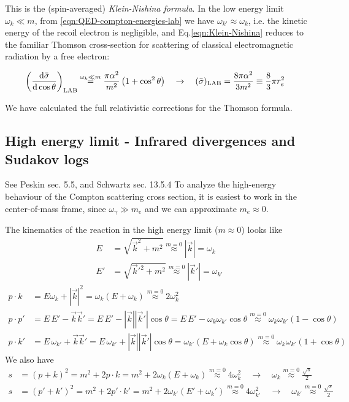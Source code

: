 \documentclass[TheoreticalPhy_ModB.tex]{subfiles}
\begin{document}
This is the (spin-averaged) \emph{Klein-Nishina formula}.
In the low energy limit $\omega_k\ll m$, from \eqref{eqn:QED-compton-energies-lab} we have $\omega_{k'}\approx\omega_{k}$, i.e. the kinetic energy of the recoil electron is negligible, and Eq.\eqref{eqn:Klein-Nishina} reduces to the familiar Thomson cross-section for scattering of classical electromagnetic radiation by a free electron:

\begin{align*}
\left(\frac{\textup{d}\bar\sigma}{\textup{d}\cos\theta}\right)_{\textup{LAB}}&\overset{\omega_k\ll m}{=}
\frac{\pi\alpha^2}{m^2}\left(1+\cos^2\theta\right)
\quad\rightarrow\quad
(\bar\sigma)_{\textup{LAB}}=\frac{8\pi\alpha^2}{3m^2}\equiv\frac83\pi r_e^2
\end{align*}

We have calculated the full relativistic corrections for the Thomson formula.

\subsection{High energy limit - Infrared divergences and Sudakov logs}
\textsf{See Peskin sec. 5.5, and Schwartz sec. 13.5.4}
To analyze the high-energy behaviour of the Compton scattering cross section, it is easiest to work in the center-of-mass frame, since $\omega_\gamma\gg m_e$ and we can approximate $m_e\approx0$.

\begin{figure}[H]
\centering

\end{figure}

The kinematics of the reaction in the high energy limit ($m\approx0$) looks like
\begin{align*}
E&=\sqrt{\vec k^2+m^2}\overset{m=0}{\approx}|\vec k|=\omega_k\\
E'&=\sqrt{\vec k'^2+m^2}\overset{m=0}{\approx}|\vec k'|=\omega_{k'}
\end{align*}
\begin{align*}
p\cdot k\,&=E\omega_k+|\vec k|^2=\omega_k(E+\omega_k)\overset{m=0}{\approx}2\omega_k^2\\
p\cdot p'&=E\,E'-\vec k\vec k'=E\,E'-|\vec k||\vec k'|\cos\theta=E\,E'-\omega_k\omega_{k'}\cos\theta\overset{m=0}{\approx}\omega_k\omega_{k'}(1-\cos\theta)\\
p\cdot k'&=E\,\omega_{k'}+\vec k\vec k'=E\,\omega_{k'}+|\vec k||\vec k'|\cos\theta=\omega_{k'}(E+\omega_k\cos\theta)\overset{m=0}{\approx}\omega_k\omega_{k'}(1+\cos\theta)
\end{align*}
We also have
\begin{align*}
s&=(p+k)^2=m^2+2p\cdot k=m^2+2\omega_k(E+\omega_k)\overset{m=0}{\approx}4\omega_k^2 \quad\rightarrow\quad \omega_k\overset{m=0}{\approx}\frac{\sqrt s}{2}\\
s&=(p'+k')^2=m^2+2p'\cdot k'=m^2+2\omega_{k'}(E'+\omega_k')\overset{m=0}{\approx}4\omega_{k'}^2 \quad\rightarrow\quad \omega_{k'}\overset{m=0}{\approx}\frac{\sqrt s}{2}
\end{align*}
\end{document}
